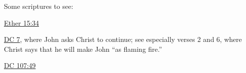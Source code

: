 		Some scriptures to see:
		
			\begin{compactitem}
				\item \hyperref[ETHER-15-34]{Ether 15:34}
				\item \hyperref[DC7]{DC 7}, where John asks Christ to continue; see especially verses 2 and 6, where Christ says that he will make John ``as flaming fire.'' 
				\item \hyperref[DC107-49]{DC 107:49}
			\end{compactitem}